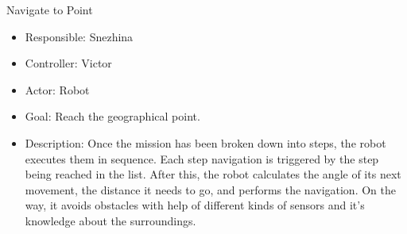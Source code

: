 Navigate to Point
\begin{itemize}
    \item Responsible: Snezhina
    \item Controller: Victor
    \item Actor: Robot
    \item Goal: Reach the geographical point.
    \item Description: Once the mission has been broken down into steps, the robot executes them in sequence. Each step navigation is triggered by the step being reached in the list. After this, the robot calculates the angle of its next movement, the distance it needs to go, and performs the navigation. On the way, it avoids obstacles with help of different kinds of sensors and it's knowledge about the surroundings.
\end{itemize}